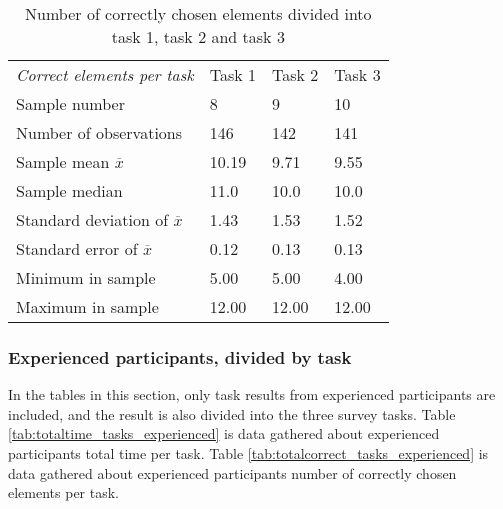\begin{table}[H]
	\centering
	\begin{tabular}{l|l|l|l}
		\textit{Correct elements per task} & Task 1 & Task 2 & Task 3\\ 
		Sample number & 8  & 9  & 10   \\ \hline
		Number of observations & 146    & 142     & 141        \\
		Sample mean $\overline{x}$ & 10.19  &  9.71  &   9.55   \\
		Sample median & 11.0 &  10.0  &  10.0   \\
		Standard deviation of $\overline{x}$ & 1.43  & 1.53 & 1.52    \\
		Standard error of $\overline{x}$ & 0.12 &  0.13 & 0.13  \\
		Minimum in sample  & 5.00  & 5.00  &   4.00  \\
		Maximum in sample  & 12.00 & 12.00  & 12.00 \\ \hline
	\end{tabular}
	\caption[Correct elements, divided into task 1, task 2 and task 3]{Number of correctly chosen elements divided into task 1, task 2 and task 3}
	\label{tab:totalcorrect_tasks}
\end{table}

\subsubsection{Experienced participants, divided by task}\label{sec:taskdivided_experienced}

In the tables in this section, only task results from experienced participants are included, and the result is also divided into the three survey tasks. Table \ref{tab:totaltime_tasks_experienced} is data gathered about experienced participants total time per task. Table \ref{tab:totalcorrect_tasks_experienced} is data gathered about experienced participants number of correctly chosen elements per task.

